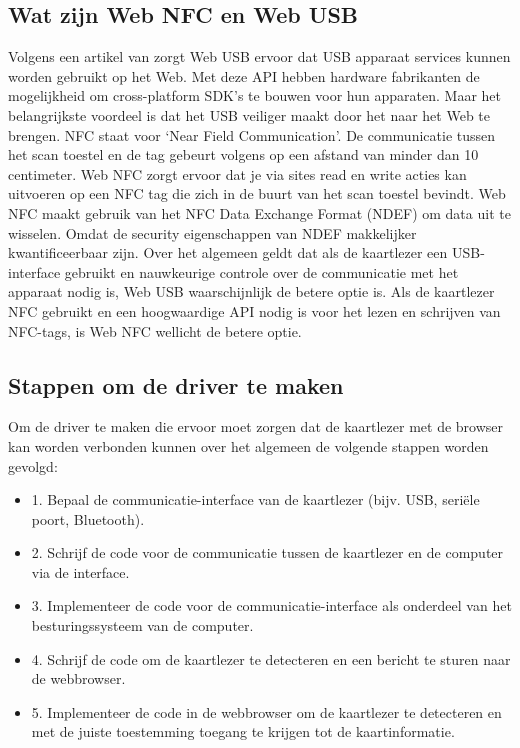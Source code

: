 \subsection{Wat zijn Web NFC en Web USB}
Volgens een artikel van \textcite{FrançoisBeaufortUSB} zorgt Web USB ervoor dat USB apparaat services kunnen worden gebruikt op het Web. Met deze API hebben hardware fabrikanten de mogelijkheid om cross-platform SDK’s te bouwen voor hun apparaten. Maar het belangrijkste voordeel is dat het USB veiliger maakt door het naar het Web te brengen.
NFC staat voor ‘Near Field Communication’. De communicatie tussen het scan toestel en de tag gebeurt volgens \textcite{FrançoisBeaufortNFC} op een afstand van minder dan 10 centimeter. Web NFC zorgt ervoor dat je via sites read en write acties kan uitvoeren op een NFC tag die zich in de buurt van het scan toestel bevindt. Web NFC maakt gebruik van het NFC Data Exchange Format (NDEF) om data uit te wisselen. Omdat de security eigenschappen van NDEF makkelijker kwantificeerbaar zijn.
Over het algemeen geldt dat als de kaartlezer een USB-interface gebruikt en nauwkeurige controle over de communicatie met het apparaat nodig is, Web USB waarschijnlijk de betere optie is. Als de kaartlezer NFC gebruikt en een hoogwaardige API nodig is voor het lezen en schrijven van NFC-tags, is Web NFC wellicht de betere optie.

\subsection{Stappen om de driver te maken}
Om de driver te maken die ervoor moet zorgen dat de kaartlezer met de browser kan worden verbonden kunnen over het algemeen de volgende stappen worden gevolgd:
\begin{itemize}
    \item 1. Bepaal de communicatie-interface van de kaartlezer (bijv. USB, seriële poort, Bluetooth).
    \item 2. Schrijf de code voor de communicatie tussen de kaartlezer en de computer via de interface.
    \item 3. Implementeer de code voor de communicatie-interface als onderdeel van het besturingssysteem van de computer.
    \item 4. Schrijf de code om de kaartlezer te detecteren en een bericht te sturen naar de webbrowser.
    \item 5. Implementeer de code in de webbrowser om de kaartlezer te detecteren en met de juiste toestemming toegang te krijgen tot de kaartinformatie.
\end{itemize}

